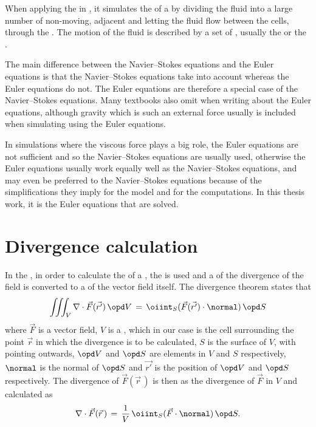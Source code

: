 When applying the \FVM in \CFD, it simulates the \flow of a \fluid by dividing the fluid into a large number of non-moving, adjacent \cells and letting the fluid flow between the cells, through the . The motion of the fluid is described by a set of \PDEs, usually the  or the .

The main difference between the Navier--Stokes equations and the Euler equations is that the Navier--Stokes equations take  into account whe\-reas the Euler equations do not. The Euler equations are therefore a special case of the Navier--Stokes equations. Many textbooks also omit  when writing about the Euler equations, although gravity which is such an external force usually is included when simulating  using the Euler equations.

In simulations where the viscous force plays a big role, the Euler equations are not sufficient and so the Navier--Stokes equations are usually used, otherwise the Euler equations usually work equally well as the Navier--Stokes equations, and may even be preferred to the Navier--Stokes equations because of the simplifications they imply for the model and for the computations. In this thesis work, it is the Euler equations that are solved.

\section{Divergence calculation}

In the \PDEs, in order to calculate the \divergence of a , the  is used and a  of the divergence of the field is converted to a  of the vector field itself. The divergence theorem states that
%
\begin{equation} \label{eq:divergence_theorem}
\iiint_V\nabla\cdot\vec{F}(\vec{r'})\,\opd V \,=\, \oiint_S(\vec{F}(\vec{r'})\cdot\normal)\,\opd S
\end{equation}
%
where $\vec{F}$ is a vector field, $V$ is a , which in our case is the cell surrounding the point $\vec{r}$ in which the divergence is to be calculated, $S$ is the surface of $V$, with  pointing outwards, $\opd V$ and $\opd S$ are \infinitesimal elements in $V$ and $S$ respectively, $\normal$ is the normal of $\opd S$ and $\vec{r'}$ is the position of $\opd V$ and $\opd S$ respectively. The divergence of $\vec{F}(\vec{r}\,)$ is then \approximated as the \average divergence of $\vec{F}$ in $V$ and calculated as
%
\begin{equation} \label{eq:divergence_surface_integral}
\nabla\cdot\vec{F}(\vec{r}\,) \,=\, \frac{1}{V}\,\oiint_S(\vec{F}\cdot\normal)\,\opd S.
\end{equation}

